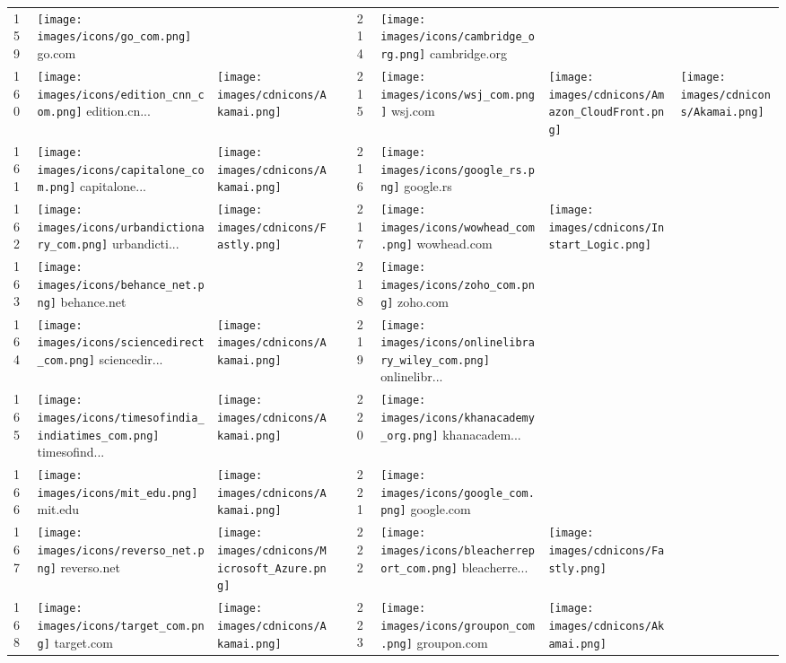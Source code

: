 \begin{table}[]
\begin{tabular}{|llll|llll|}
159 & \texttt{[image: images/icons/go\_com.png]} go.com & & & 214 & \texttt{[image: images/icons/cambridge\_org.png]} cambridge.org & & \\
160 & \texttt{[image: images/icons/edition\_cnn\_com.png]} edition.cn... & \texttt{[image: images/cdnicons/Akamai.png]} & & 215 & \texttt{[image: images/icons/wsj\_com.png]} wsj.com & \texttt{[image: images/cdnicons/Amazon\_CloudFront.png]} & \texttt{[image: images/cdnicons/Akamai.png]} \\
161 & \texttt{[image: images/icons/capitalone\_com.png]} capitalone... & \texttt{[image: images/cdnicons/Akamai.png]} & & 216 & \texttt{[image: images/icons/google\_rs.png]} google.rs & & \\
162 & \texttt{[image: images/icons/urbandictionary\_com.png]} urbandicti... & \texttt{[image: images/cdnicons/Fastly.png]} & & 217 & \texttt{[image: images/icons/wowhead\_com.png]} wowhead.com & \texttt{[image: images/cdnicons/Instart\_Logic.png]} & \\
163 & \texttt{[image: images/icons/behance\_net.png]} behance.net & & & 218 & \texttt{[image: images/icons/zoho\_com.png]} zoho.com & & \\
164 & \texttt{[image: images/icons/sciencedirect\_com.png]} sciencedir... & \texttt{[image: images/cdnicons/Akamai.png]} & & 219 & \texttt{[image: images/icons/onlinelibrary\_wiley\_com.png]} onlinelibr... & & \\
165 & \texttt{[image: images/icons/timesofindia\_indiatimes\_com.png]} timesofind... & \texttt{[image: images/cdnicons/Akamai.png]} & & 220 & \texttt{[image: images/icons/khanacademy\_org.png]} khanacadem... & & \\
166 & \texttt{[image: images/icons/mit\_edu.png]} mit.edu & \texttt{[image: images/cdnicons/Akamai.png]} & & 221 & \texttt{[image: images/icons/google\_com.png]} google.com & & \\
167 & \texttt{[image: images/icons/reverso\_net.png]} reverso.net & \texttt{[image: images/cdnicons/Microsoft\_Azure.png]} & & 222 & \texttt{[image: images/icons/bleacherreport\_com.png]} bleacherre... & \texttt{[image: images/cdnicons/Fastly.png]} & \\
168 & \texttt{[image: images/icons/target\_com.png]} target.com & \texttt{[image: images/cdnicons/Akamai.png]} & & 223 & \texttt{[image: images/icons/groupon\_com.png]} groupon.com & \texttt{[image: images/cdnicons/Akamai.png]} & \\

\end{tabular}
\end{table}
